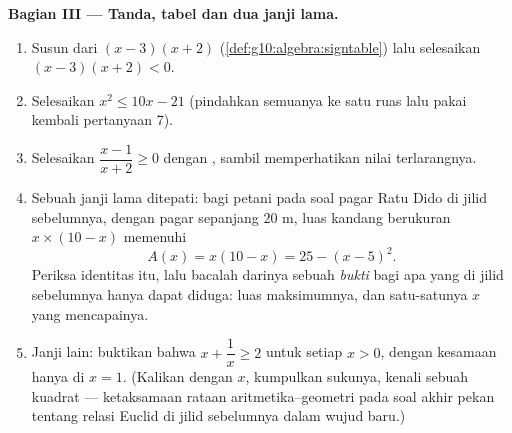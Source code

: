 \begin{problem}[{Soal akhir pekan --- soal jumlah-dan-hasil-kali,
melengkapkan kuadrat sempurna sebagaimana digambar al-Khwarizmi, dan
persamaan $x^2 = x + 1$}]
\medskip
\noindent\textbf{Bagian III --- Tanda, tabel dan dua janji
lama.}
\begin{enumerate}[resume]
  \item Susun  dari $(x - 3)(x + 2)$
        (\cref{def:g10:algebra:signtable}) lalu selesaikan
        $(x - 3)(x + 2) < 0$.
  \item Selesaikan $x^2 \leq 10x - 21$ (pindahkan semuanya ke satu ruas
        lalu pakai kembali pertanyaan 7).
  \item Selesaikan $\dfrac{x - 1}{x + 2} \geq 0$ dengan ,
        sambil memperhatikan nilai terlarangnya.
  \item Sebuah janji lama ditepati: bagi petani pada soal pagar Ratu Dido
        di jilid sebelumnya, dengan pagar sepanjang $20$ m, luas
        kandang berukuran $x \times (10 - x)$ memenuhi
        \[
        A(x) = x(10 - x) = 25 - (x - 5)^2 .
        \]
        Periksa identitas itu, lalu bacalah darinya sebuah \emph{bukti}
        bagi apa yang di jilid sebelumnya hanya dapat diduga: luas
        maksimumnya, dan satu-satunya $x$ yang mencapainya.
  \item Janji lain: buktikan bahwa $x + \dfrac1x \geq 2$ untuk setiap
        $x > 0$, dengan kesamaan hanya di $x = 1$. (Kalikan dengan
        $x$, kumpulkan sukunya, kenali sebuah kuadrat --- ketaksamaan
        rataan aritmetika--geometri pada soal akhir pekan tentang relasi
        Euclid di jilid sebelumnya dalam wujud baru.)
\end{enumerate}


\end{problem}
